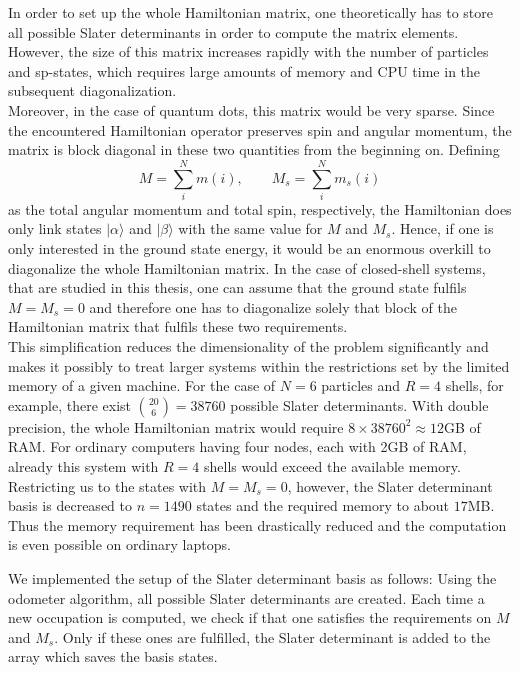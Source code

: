 In order to set up the whole Hamiltonian matrix, one theoretically has to store all possible Slater determinants in order to compute the matrix elements. However, the size of this matrix increases rapidly with the number of particles and sp-states, which requires large amounts of memory and CPU time in the subsequent diagonalization. \\
Moreover, in the case of quantum dots, this matrix would be very sparse. Since the encountered Hamiltonian operator preserves spin and angular momentum, the matrix is block diagonal in these two quantities from the beginning on. Defining 
\[
M = \sum_i^N m(i), \qquad M_s = \sum_i^N m_s(i)
\]
as the total angular momentum and total spin, respectively, the Hamiltonian does only link states $|\alpha\rangle$ and $|\beta\rangle$ with the same value for $M$ and $M_s$. Hence, if one is only interested in the ground state energy, it would be an enormous overkill to diagonalize the whole Hamiltonian matrix. In the case of closed-shell systems, that are studied in this thesis, one can assume that the ground state fulfils $M = M_s = 0$ and therefore one has to diagonalize solely that block of the Hamiltonian matrix that fulfils these two requirements. \\
This simplification reduces the dimensionality of the problem significantly and makes it possibly to treat larger systems within the restrictions set by the limited memory of a given machine. For the case of $N = 6$ 
particles and $R = 4$ shells, for example, there exist $\binom{20}{6} = 38760$ possible Slater 
determinants. With double precision, the whole Hamiltonian matrix would require $8\times 38760^2 \approx 12$GB of RAM. For ordinary computers having four nodes, each with 2GB of RAM, already this system with 
$R=4$ shells would exceed the available memory. Restricting us to the states with $M = M_s = 0$, however, 
the Slater determinant basis is decreased to $n =1490$ states and the required memory to about $17$MB. Thus the memory requirement has been drastically reduced and the computation is even possible on ordinary laptops.

We implemented the setup of the Slater determinant basis as follows: Using the odometer algorithm, all possible Slater determinants are created. Each time a new occupation is computed, we check if that one satisfies the requirements on $M$ and $M_s$. Only if these ones are fulfilled, the Slater determinant is added to the array which saves the basis states.

